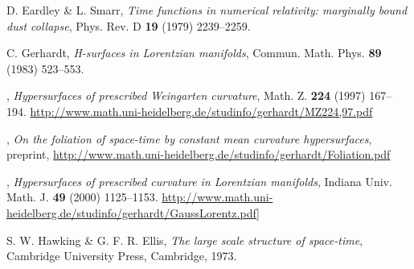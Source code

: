 \documentclass[ a4paper, oneside]{amsart}
\newcommand{\nbdd}{\nobreakdash--}
\newcommand{\tbf}{\textbf}
\providecommand{\bysame}{\makeboc[3em]{\hrulefill}\thinspace}
\newcommand{\bib}{\bibitem}
\theoremstyle{plain}
\theoremstyle{definition}
\theoremstyle{remark}
\numberwithin{equation}{section}
\begin{document}
\begin{thebibliography}{99}
\bib{es}
D. Eardley \& L. Smarr, \emph{Time functions in numerical relativity: marginally
bound dust collapse}, Phys. Rev. D \tbf{19} (1979) 2239\nbdd2259.


\bib{cg1}
C. Gerhardt, \emph{H-surfaces in Lorentzian manifolds}, Commun. Math. Phys.
\tbf{89} (1983) 523\nbdd{553}.



\bib{cg4}
\bysame, \emph{Hypersurfaces of prescribed Weingarten curvature}, Math. Z.
\tbf{224} (1997) 167\nbdd{194}.
\url{http://www.math.uni-heidelberg.de/studinfo/gerhardt/MZ224,97.pdf}



\bib{cg6}
\bysame, \emph{On the foliation of space-time by constant mean curvature
hypersurfaces}, preprint,
\url{http://www.math.uni-heidelberg.de/studinfo/gerhardt/Foliation.pdf}


\bib{cg8}
\bysame, \emph{Hypersurfaces of
prescribed  curvature in Lorentzian manifolds}, Indiana Univ. Math. J. \tbf{49}
(2000) 1125\nbdd1153.
\url{http://www.math.uni-heidelberg.de/studinfo/gerhardt/GaussLorentz.pdf}]





\bib{HE}
S. W. Hawking \& G. F. R. Ellis, \emph{The large scale structure of space-time},
Cambridge University Press, Cambridge, 1973.



\end{thebibliography}
\end{document}
